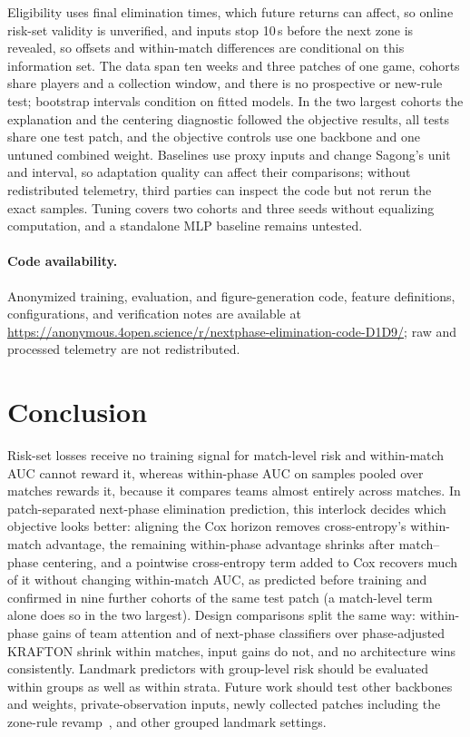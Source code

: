\documentclass[sigconf,anonymous,nonacm]{acmart}
\newcommand{\artifacturl}{\url{https://anonymous.4open.science/r/nextphase-elimination-code-D1D9/}}
\begin{document}
Eligibility uses final elimination times, which future returns can affect, so online risk-set validity is unverified, and inputs stop 10\,s before the next zone is revealed, so offsets and within-match differences are conditional on this information set. The data span ten weeks and three patches of one game, cohorts share players and a collection window, and there is no prospective or new-rule test; bootstrap intervals condition on fitted models. In the two largest cohorts the explanation and the centering diagnostic followed the objective results, all tests share one test patch, and the objective controls use one backbone and one untuned combined weight. Baselines use proxy inputs and change Sagong's unit and interval, so adaptation quality can affect their comparisons; without redistributed telemetry, third parties can inspect the code but not rerun the exact samples. Tuning covers two cohorts and three seeds without equalizing computation, and a standalone MLP baseline remains untested.

\paragraph{Code availability.}
Anonymized training, evaluation, and figure-generation code, feature definitions, configurations, and verification notes are available at \artifacturl{}; raw and processed telemetry are not redistributed.

\section{Conclusion}
\label{sec:conclusion}
Risk-set losses receive no training signal for match-level risk and within-match AUC cannot reward it, whereas within-phase AUC on samples pooled over matches rewards it, because it compares teams almost entirely across matches. In patch-separated next-phase elimination prediction, this interlock decides which objective looks better: aligning the Cox horizon removes cross-entropy's within-match advantage, the remaining within-phase advantage shrinks after match--phase centering, and a pointwise cross-entropy term added to Cox recovers much of it without changing within-match AUC, as predicted before training and confirmed in nine further cohorts of the same test patch (a match-level term alone does so in the two largest). Design comparisons split the same way: within-phase gains of team attention and of next-phase classifiers over phase-adjusted KRAFTON shrink within matches, input gains do not, and no architecture wins consistently. Landmark predictors with group-level risk should be evaluated within groups as well as within strata. Future work should test other backbones and weights, private-observation inputs, newly collected patches including the zone-rule revamp~\cite{PUBGBlueZone2026}, and other grouped landmark settings.
\end{document}
